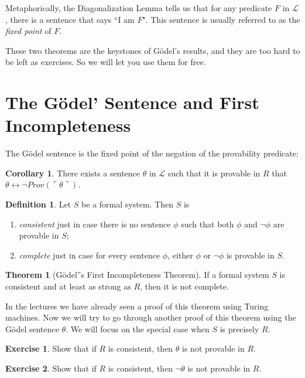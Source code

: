 \documentclass[11pt]{article}
\theoremstyle{definition}
\newtheorem{defn}{Definition}
\newtheorem{exer}{Exercise}
\newtheorem{theorem}{Theorem}[section]
\newtheorem{corollary}{Corollary}[theorem]
\begin{document}
Metaphorically, the Diagonalization Lemma tells us that for any predicate $F$ in $\mathscr{L}$, there is a sentence that says ``I am $F$". This sentence is usually referred to as the \textit{fixed point} of $F$.

These two theorems are the keystones of G\"odel's results, and they are too hard to be left as exercises. So we will let you use them for free.

\section{The G\"odel' Sentence and First Incompleteness}

The G\"odel sentence is the fixed point of the negation of the provability predicate:

\begin{corollary} \label{GS}
There exists a sentence $\theta$ in $\mathscr{L}$ such that it is provable in $R$ that $\theta \leftrightarrow \neg Prov (\ulcorner \theta \urcorner)$.
\end{corollary}

\begin{defn} \label{ConsistentComplete}
Let $S$ be a formal system. Then $S$ is
\begin{enumerate}
\item \textit{consistent} just in case there is no sentence $\phi$ such that both $\phi$ and $\neg \phi$ are provable in $S$;
\item \textit{complete} just in case for every sentence $\phi$, either $\phi$ or $\neg \phi$ is provable in $S$.
\end{enumerate}
\end{defn}

\begin{theorem}[G\"odel''s First Incompleteness Theorem] If a formal system $S$ is consistent and at least as strong as $R$, then it is not complete.
\end{theorem}

In the lectures we have already seen a proof of this theorem using Turing machines. Now we will try to go through another proof of this theorem using the G\"odel sentence $\theta$. We will focus on the special case when $S$ is precisely $R$.

\begin{exer} \label{Exer}
Show that if $R$ is consistent, then $\theta$ is not provable in $R$.
\end{exer}

\begin{exer}
Show that if $R$ is consistent, then $\neg \theta$ is not provable in $R$.
\end{exer}
\end{document}
